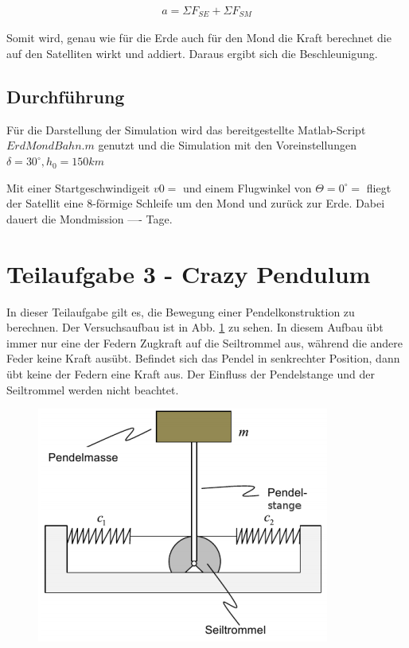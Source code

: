 \documentclass[]{scrartcl}
\begin{document}
\begin{align}
a = \Sigma{F}_{SE} + \Sigma{F}_{SM}
\end{align}

Somit wird, genau wie für die Erde auch für den Mond die Kraft berechnet die auf den Satelliten wirkt und addiert. Daraus ergibt sich die Beschleunigung.


\subsection{Durchführung}

Für die Darstellung der Simulation wird das bereitgestellte Matlab-Script $ErdMondBahn.m$ genutzt und die Simulation mit den Voreinstellungen 
 $\delta = 30^\circ, h_0 = 150km$
 
Mit einer Startgeschwindigeit $v0 = $ und einem Flugwinkel von $\Theta = 0^\circ = $ fliegt der Satellit eine 8-förmige Schleife um den Mond und zurück zur Erde. Dabei dauert die Mondmission ---- Tage.

\section{Teilaufgabe 3 - Crazy Pendulum}
In dieser Teilaufgabe gilt es, die Bewegung einer Pendelkonstruktion zu berechnen. Der Versuchsaufbau ist in Abb. \ref{fig:3_Versuchsaufbau} zu sehen. In diesem Aufbau übt immer nur eine der Federn Zugkraft auf die Seiltrommel aus, während die andere Feder keine Kraft ausübt. Befindet sich das Pendel in senkrechter Position, dann übt keine der Federn eine Kraft aus. Der Einfluss der Pendelstange und der Seiltrommel werden nicht beachtet.

\begin{figure}[H]
\centering
\includegraphics[width=0.5\linewidth]{./3_Versuchsaufbau}
\caption{}
\label{fig:3_Versuchsaufbau}
\end{figure}
\end{document}
